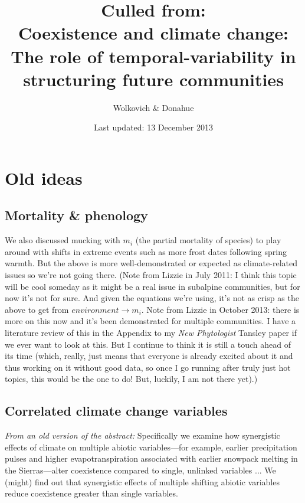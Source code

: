 \documentclass[11pt,a4paper,oneside]{article}
\begin{document}
\renewcommand{\labelitemi}{$-$}
\title{Culled from: \\Coexistence and climate change: \\The role of
    temporal-variability in structuring future communities}
    \author{Wolkovich \& Donahue}
\date{Last updated: 13 December 2013}
\maketitle

\tableofcontents

\newpage
\section{Old ideas}

\subsection{Mortality \& phenology}

\noindent We also discussed mucking with \(m_{i}\) (the partial
mortality of species) to play around with
shifts in extreme events such as more frost dates following spring
warmth. But the above is more well-demonstrated or expected as
climate-related issues so we're not going there. (Note from Lizzie in
July 2011: I think this topic will be cool someday as it might be a
real issue in subalpine communities, but for now it's not for
sure. And given the equations we're using, it's not as crisp as the
above to get from \(environment\rightarrow m_{i}\). Note from Lizzie in October 2013: there is more on this now and it's been demonstrated for multiple communities. I have a literature review of this in the Appendix to my \emph{New Phytologist} Tansley paper if we ever want to look at this. But I continue to think it is still a touch ahead of its time (which, really, just means that everyone is already excited about it and thus working on it without good data, so once I go running after truly just hot topics, this would be the one to do! But, luckily, I am not there yet).)\\ 

\subsection{Correlated climate change variables}
\noindent \emph{From an old version of the abstract:} Specifically we examine how
synergistic effects of climate on multiple abiotic variables---for
example, earlier precipitation pulses and higher evapotranspiration
associated with earlier snowpack melting in the Sierras---alter
coexistence compared to single, unlinked variables ... We
  (might) find out that synergistic effects of multiple shifting
  abiotic variables reduce coexistence greater than single
  variables. \\
\end{document}
